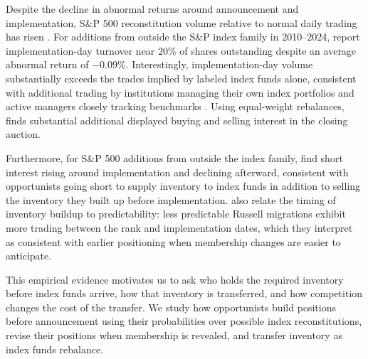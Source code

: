 \documentclass[12pt]{article}
\numberwithin{equation}{section}
\theoremstyle{definition}
\begin{document}
Despite the decline in abnormal returns around announcement and implementation,
S\&P 500 reconstitution volume relative to normal daily trading has risen
\citep{ChincoSammon2024}. For additions from outside the S\&P index family in
2010--2024, \citet{PegoraroSammonShim2026} report implementation-day turnover
near \(20\%\) of shares outstanding despite an average abnormal return of
\(-0.09\%\). Interestingly, implementation-day volume substantially exceeds the trades
implied by labeled index funds alone, consistent with additional trading by
institutions managing their own index portfolios and active managers closely
tracking benchmarks \citep{ChincoSammon2024}. Using equal-weight rebalances,
\citet{Nathan2026} finds substantial additional displayed buying and selling
interest in the closing auction.

Furthermore, for S\&P 500 additions from outside the index family,
\citet{PegoraroSammonShim2026} find short interest rising around implementation
and declining afterward, consistent with opportunists going short to supply
inventory to index funds in addition to selling the inventory they built up
before implementation.
\citet{PegoraroSammonShim2026} also relate the timing of inventory buildup to
predictability: less predictable Russell migrations exhibit more trading
between the rank and implementation dates, which they interpret as consistent
with earlier positioning when membership changes are easier to anticipate.

This empirical evidence motivates us to ask who holds the required inventory
before index funds arrive, how that inventory is transferred, and how
competition changes the cost of the transfer. We study how opportunists build
positions before announcement using their probabilities over possible index
reconstitutions, revise their positions when membership is revealed, and
transfer inventory as index funds rebalance.
\end{document}
